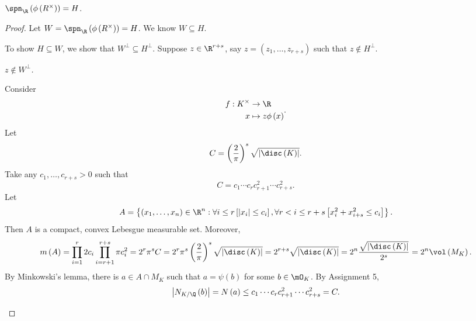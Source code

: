 \documentclass[pmath441]{subfiles}
\begin{document}
    \begin{prop}{}
        $\spn_{\R}\left( \phi\left( R^{\times} \right) \right)=H$.
    \end{prop}

    \begin{proof}
        Let $W=\spn_{\R}\left( \phi\left( R^{\times} \right) \right)=H$. We know $W\subseteq H$.

        To show $H\subseteq W$, we show that $W^\perp\subseteq H^\perp$. Suppose $z\in\R^{r+s}$, say $z=\left( z_1,\ldots,z_{r+s} \right)$ such that $z\notin H^{\perp}$. 

        \begin{claim}
            \textit{$z\notin W^{\perp}$.}

            Consider
            \begin{equation*}
                \begin{aligned}
                    f:K^{\times}&\to\R \\
                    x & \mapsto z\phi\left( x \right)
                \end{aligned} .
            \end{equation*}
            Let
            \begin{equation*}
                C = \left( \frac{2}{\pi} \right)^s\sqrt{\left| \disc\left( K \right) \right|}.
            \end{equation*}
            Take any $c_1,\ldots,c_{r+s}>0$ such that
            \begin{equation*}
                C = c_1\cdots c_rc_{r+1}^{2}\cdots c_{r+s}^{2}.
            \end{equation*}
            Let
            \begin{equation*}
                A = \left\lbrace \left( x_1,\ldots,x_n \right)\in\R^n : \forall i\leq r \left[ \left| x_i \right|\leq c_i \right], \forall r<i\leq r+s\left[ x_i^{2}+x_{i+s}^{2}\leq c_i \right] \right\rbrace.
            \end{equation*}
            Then $A$ is a compact, convex Lebesgue measurable set. Moreover,
            \begin{equation*}
                m\left( A \right) = \prod^{r}_{i=1}2c_i\prod^{r+s}_{i=r+1}\pi c_i^{2} = 2^r\pi^sC = 2^r\pi^s\left( \frac{2}{\pi} \right)^s\sqrt{\left| \disc\left( K \right) \right|} = 2^{r+s}\sqrt{\left| \disc\left( K \right) \right|} = 2^n \frac{\sqrt{\left| \disc\left( K \right) \right|}}{2^s} = 2^n\vol\left( M_K \right).
            \end{equation*}
            By Minkowski's lemma, there is $a\in A\cap M_K$ such that $a=\psi\left( b \right)$ for some $b\in\mO_K$. By Assignment 5,
            \begin{equation*}
                \left| N_{K /\Q}\left( b \right) \right| = N\left( a \right) \leq c_1\cdots c_rc_{r+1}^{2}\cdots c_{r+s}^{2}=C.
            \end{equation*}
            

\end{claim}
\end{proof}
\end{document}

